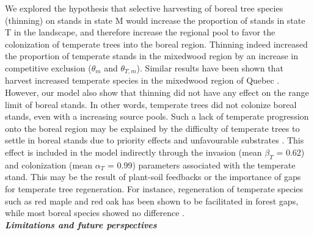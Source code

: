 We explored the hypothesis that selective harvesting of boreal tree
species (thinning) on stands in state M would increase the proportion of
stands in state T in the landscape, and therefore increase the regional
pool to favor the colonization of temperate trees into the boreal
region. Thinning indeed increased the proportion of temperate stands in
the mixedwood region by an increase in competitive exclusion
(\(\theta_{m}\) and \(\theta_{T, m}\)). Similar results have been shown
that harvest increased temperate species in the mixedwood region of
Quebec \citep{Boulanger2019, Brice2020}. However, our model also show
that thinning did not have any effect on the range limit of boreal
stands. In other words, temperate trees did not colonize boreal stands,
even with a increasing source pools. Such a lack of temperate
progression onto the boreal region may be explained by the difficulty of
temperate trees to settle in boreal stands due to priority effects and
unfavourable substrates \citep{Solarik2018, Solarik2020}. This effect is
included in the model indirectly through the invasion (mean
\(\beta_{T}\) = 0.62) and colonization (mean \(\alpha_{T}\) = 0.99)
parameters associated with the temperate stand. This may be the result
of plant-soil feedbacks or the importance of gaps for temperate tree
regeneration. For instance, regeneration of temperate species such as
red maple and red oak has been shown to be facilitated in forest gaps,
while most boreal species showed no difference \citep{Leithead2010}.\\

\textbf{\emph{Limitations and future perspectives}}

